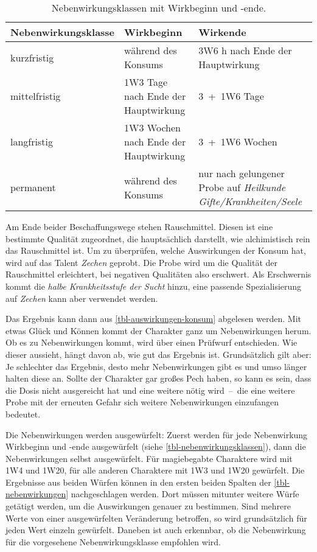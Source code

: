 {
\begin{table}
	\centering
	\caption[Nebenwirkungsklassen]{Nebenwirkungsklassen mit Wirkbeginn und -ende.\label{tbl-nebenwirkungsklassen}}
	\begin{tabularx}{\textwidth}{p{3.25cm}p{6.75cm}p{5.7cm}}
		\toprule
		Nebenwirkungsklasse & Wirkbeginn & Wirkende \\
		\hline
		kurzfristig & während des Konsums & 3W6 h nach Ende der Hauptwirkung \\
		mittelfristig & 1W3 Tage nach Ende der Hauptwirkung & 3~+~1W6 Tage \\
		langfristig & 1W3 Wochen nach Ende der Hauptwirkung & 3~+~1W6 Wochen \\
		permanent & während des Konsums & nur nach gelungener Probe auf \emph{Heilkunde Gifte/Krankheiten/Seele} \\
		\bottomrule
	\end{tabularx}
\end{table}
}
Am Ende beider Beschaffungswege stehen Rauschmittel. Diesen ist eine bestimmte Qualität zugeordnet, die hauptsächlich darstellt, wie alchimistisch rein das Rauschmittel ist. Um zu überprüfen, welche Auswirkungen der Konsum hat, wird auf das Talent \emph{Zechen} geprobt. Die Probe wird um die Qualität der Rauschmittel erleichtert, bei negativen Qualitäten also erschwert. Als Erschwernis kommt die \emph{halbe Krankheitsstufe der Sucht} hinzu, eine passende Spezialisierung auf \emph{Zechen} kann aber verwendet werden.

Das Ergebnis kann dann aus \vref{tbl-auswirkungen-konsum} abgelesen werden. Mit etwas Glück und Können kommt der Charakter ganz um Nebenwirkungen herum. Ob es zu Nebenwirkungen kommt, wird über einen Prüfwurf entschieden. Wie dieser aussieht, hängt davon ab, wie gut das Ergebnis ist. Grundsätzlich gilt aber: Je schlechter das Ergebnis, desto mehr Nebenwirkungen gibt es und umso länger halten diese an. Sollte der Charakter gar großes Pech haben, so kann es sein, dass die Dosis nicht ausgereicht hat und eine weitere nötig wird~--~die eine weitere Probe mit der erneuten Gefahr sich weitere Nebenwirkungen einzufangen bedeutet.

Die Nebenwirkungen werden ausgewürfelt: Zuerst werden für jede Nebenwirkung Wirkbeginn und -ende ausgewürfelt (siehe \vref{tbl-nebenwirkungsklassen}), dann die Nebenwirkungen selbst ausgewürfelt. Für magiebegabte Charaktere wird mit 1W4 und 1W20, für alle anderen Charaktere mit 1W3 und 1W20 gewürfelt. Die Ergebnisse aus beiden Würfen können in den ersten beiden Spalten der \vref{tbl-nebenwirkungen} nachgeschlagen werden. Dort müssen mitunter weitere Würfe getätigt werden, um die Auswirkungen genauer zu bestimmen. Sind mehrere Werte von einer ausgewürfelten Veränderung betroffen, so wird grundsätzlich für jeden Wert einzeln gewürfelt. Daneben ist auch erkennbar, ob die Nebenwirkung für die vorgesehene Nebenwirkungsklasse empfohlen wird.

